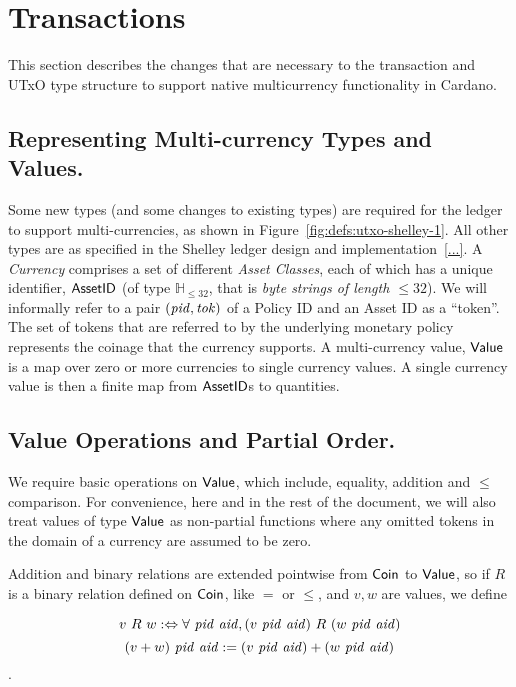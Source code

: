 \section{Transactions}
\label{sec:transactions}

This section describes the changes that are necessary to the transaction and
UTxO type structure to support native multicurrency functionality
in Cardano.

\subsection*{Representing Multi-currency Types and Values.}
Some new types (and some changes to existing types) are required for
the ledger to support multi-currencies, as shown in Figure~\ref{fig:defs:utxo-shelley-1}.
All other types are as specified in the Shelley ledger design and implementation~\ref{...}.
A \emph{Currency} comprises a set of different \emph{Asset Classes}, each of which has
a unique identifier, $\mathsf{AssetID}$  (of type $\mathbb{H}_{\leq 32}$, that is \emph{byte strings of length $\leq 32$}). We will informally refer to a pair $(\mathit{pid}, \mathit{tok})$ of a Policy ID and an Asset ID as a ``token''.
The set of tokens that are referred to by the underlying monetary policy represents the coinage that the currency supports.  A multi-currency value, $\mathsf{Value}$ is a map over zero or more currencies
to single currency values.  A single currency value is then a finite map from
$\mathsf{AssetID}$s to quantities.

\subsection*{Value Operations and Partial Order.}
We require basic operations on $\mathsf{Value}$, which include, equality, addition and $\leq$ comparison.
For convenience, here and in the rest of the document, we
will also treat values of type $\mathsf{Value}$ as non-partial functions where
any omitted tokens in the domain of a currency are assumed to be zero.

Addition and binary relations are extended pointwise from $\mathsf{Coin}$ to $\mathsf{Value}$, so if $R$ is a binary relation defined on $\mathsf{Coin}$, like $=$ or $\leq$, and $v, w$ are values, we define

\[ v~R~w :\Leftrightarrow \forall~\mathit{pid}~\mathit{aid}, (v~\mathit{pid}~\mathit{aid})~R~(w~\mathit{pid}~\mathit{aid}) \]
\[(v + w)~\mathit{pid}~\mathit{aid} := (v~\mathit{pid}~\mathit{aid}) + (w~\mathit{pid}~\mathit{aid}) \].

